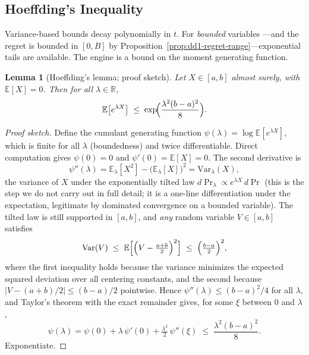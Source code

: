\documentclass[11pt,a4paper]{article}
\theoremstyle{definition}
\theoremstyle{plain}
\newtheorem{lemma}{Lemma}[section]
\newcommand{\R}{\mathbb{R}}
\newcommand{\E}{\mathbb{E}}
\newcommand{\Var}{\mathrm{Var}}
\begin{document}
\subsection{Hoeffding's Inequality}

Variance-based bounds decay polynomially in $t$. For \emph{bounded} variables
---and the regret is bounded in $[0, B]$ by
Proposition~\ref{prop:dd1-regret-range}---exponential tails are available.
The engine is a bound on the moment generating function.

\begin{lemma}[Hoeffding's lemma; proof sketch]
\label{lem:dd1-hoeffding-lemma}
Let $X \in [a, b]$ almost surely, with $\E[X] = 0$. Then for all
$\lambda \in \R$,
\begin{equation}
\label{eq:dd1-hoeffding-lemma}
\E\bigl[ e^{\lambda X} \bigr] \;\le\;
\exp\!\Bigl( \frac{\lambda^2 (b - a)^2}{8} \Bigr).
\end{equation}
\end{lemma}

\begin{proof}[Proof sketch]
Define the cumulant generating function $\psi(\lambda) = \log \E[e^{\lambda
X}]$, which is finite for all $\lambda$ (boundedness) and twice
differentiable. Direct computation gives $\psi(0) = 0$ and
$\psi'(0) = \E[X] = 0$. The second derivative is
\[
\psi''(\lambda) = \E_\lambda[X^2] - \bigl(\E_\lambda[X]\bigr)^2
= \Var_\lambda(X),
\]
the variance of $X$ under the exponentially tilted law
$d\Pr_\lambda \propto e^{\lambda X}\, d\Pr$ (this is the step we do not carry
out in full detail; it is a one-line differentiation under the expectation,
legitimate by dominated convergence on a bounded variable). The tilted law is
still supported in $[a, b]$, and \emph{any} random variable $V \in [a, b]$
satisfies
\[
\Var(V) \;\le\; \E\Bigl[\Bigl(V - \tfrac{a + b}{2}\Bigr)^2\Bigr]
\;\le\; \Bigl(\tfrac{b - a}{2}\Bigr)^2,
\]
where the first inequality holds because the variance minimizes the expected
squared deviation over all centering constants, and the second because
$|V - (a+b)/2| \le (b-a)/2$ pointwise. Hence
$\psi''(\lambda) \le (b - a)^2 / 4$ for all $\lambda$, and Taylor's theorem
with the exact remainder gives, for some $\xi$ between $0$ and $\lambda$,
\[
\psi(\lambda) = \psi(0) + \lambda\,\psi'(0)
+ \tfrac{\lambda^2}{2}\,\psi''(\xi)
\;\le\; \frac{\lambda^2 (b-a)^2}{8}.
\]
Exponentiate.
\end{proof}
\end{document}
